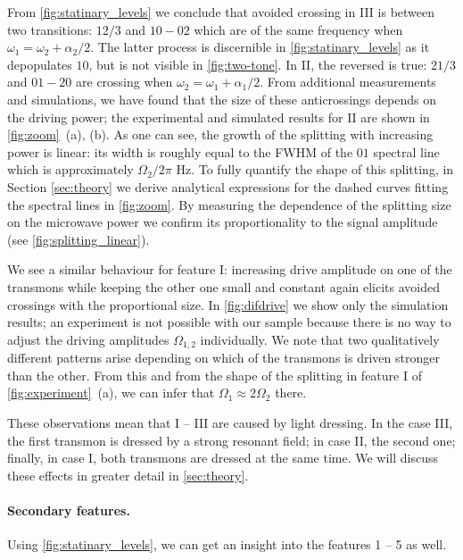 \documentclass[%
 aip,
 amsmath,amssymb,
 reprint,%
]{revtex4-1}
\begin{document}
From \autoref{fig:statinary_levels} we conclude that avoided crossing in III is between two transitions: ${12/3}$ and ${10} - {02}$ which are of the same frequency when $\omega_1 = \omega_2+\alpha_2/2$. The latter process is discernible in \autoref{fig:statinary_levels} as it depopulates ${10}$, but is not visible in \autoref{fig:two-tone}. In II, the reversed is true: ${21/3}$ and ${01} - {20}$ are crossing when $\omega_2 = \omega_1+\alpha_1/2$. From additional measurements and simulations, we have found that the size of these anticrossings depends on the driving power; the experimental and simulated results for II are shown in \autoref{fig:zoom}~(a), (b). As one can see, the growth of the splitting with increasing power is linear: its width is roughly equal to the FWHM of the ${01}$ spectral line which is approximately $\Omega_2/2\pi$ Hz. To fully quantify the shape of this splitting, in Section \ref{sec:theory} we derive analytical expressions for the dashed curves fitting the spectral lines in \autoref{fig:zoom}. By measuring the dependence of the splitting size on the microwave power we confirm its proportionality to the signal amplitude (see \autoref{fig:splitting_linear}).

We see a similar behaviour for feature I: increasing drive amplitude on one of the transmons while keeping the other one small and constant again elicits avoided crossings with the proportional size. In \autoref{fig:difdrive} we show only the simulation results; an experiment is not possible with our sample because there is no way to adjust the driving amplitudes $\Omega_{1,2}$ individually. We note that two qualitatively different patterns arise depending on which of the transmons is driven stronger than the other. From this and from the shape of the splitting in feature I of \autoref{fig:experiment}~(a), we can infer that $\Omega_1 \approx 2\Omega_2$ there.

These observations mean that I -- III are caused by light dressing. In the case III, the first transmon is dressed by a strong resonant field; in case II, the second one; finally, in case I, both transmons are dressed at the same time. We will discuss these effects in greater detail in \autoref{sec:theory}.

\paragraph{Secondary features.} Using \autoref{fig:statinary_levels}, we can get an insight into the features 1 -- 5 as well. 
\end{document}
